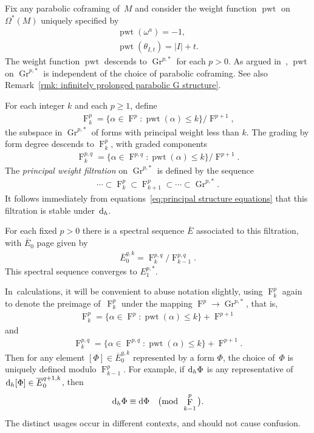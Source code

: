 \documentclass[10pt,a4paper]{amsart}
\DeclareMathOperator{\Gr}{Gr}
\renewcommand{\d}{{\rm d}}
\renewcommand{\mod}[1]{\quad\big(\mathrm{mod\enspace} #1\big)}
\newcommand{\thetas}[1]{\theta_{#1}}
\DeclareMathOperator{\pwf}{F}
\DeclareMathOperator{\pwt}{\mathrm{pwt}}
\renewcommand{\dh}{\ensuremath{\hspace{1pt} \d_h}}
\numberwithin{equation}{section}
\begin{document}
\begin{Example}
 Fix any parabolic coframing of~$M$ and consider the weight function $\pwt$ on $\Omega^*(M)$ uniquely specified by
 \begin{gather*}
 \pwt(\omega^a) = -1,
 \\
 \pwt(\thetas{I,t}) = |I| + t .
 \end{gather*}
 The weight function $\pwt$ descends to $\Gr^{p,*}$ for each $p>0$. As argued in~\cite{Characteristic_Cohomology_I}, $\pwt$ on $\Gr^{p,*}$ is independent of the choice of parabolic coframing. See also Remark~\ref{rmk: infinitely prolonged parabolic G structure}.

 For each integer $k$ and each $p \ge 1$, define
 \begin{gather*}
 \pwf^{p}_k =\big \{ \alpha \in \pwf^p \colon \pwt(\alpha) \le k\big \}/\pwf^{p+1} ,
 \end{gather*}
 the subspace in $\Gr^{p,*}$ of forms with principal weight less than $k$.
 The grading by form degree descends to $\pwf^p_k$, with graded components
 \begin{gather*}
 \pwf^{p,q}_k = \big\{ \alpha \in \pwf^{p,q} \colon \pwt(\alpha) \le k\big \}/\pwf^{p+1} .
 \end{gather*}
 The \emph{principal weight filtration} on $\Gr^{p,*}$ is defined by the sequence
 \begin{gather*}
 \cdots \subset \pwf^{p}_k \subset \pwf^{p}_{k+1} \subset \cdots \subset \Gr^{p,*} .
 \end{gather*}
 It follows immediately from equations~\eqref{eq:principal structure equations} that this filtration is stable under $\dh$.

 For each fixed $p>0$ there is a spectral sequence $\overline{E}$ associated to this filtration, with $\overline{E}_0$ page given by
 \begin{gather*}
 \overline{E}_0^{q,k} = \pwf^{p,q}_k/\pwf^{p,q}_{k-1} .
 \end{gather*}
 This spectral sequence converges to $E^{p,*}_1$.

 In~calculations, it will be convenient to abuse notation slightly, using $\pwf^p_k$ again to denote the preimage of~$\pwf^p_k$ under the mapping $\pwf^p \to \Gr^{p,*}$, that is,
 \begin{gather*}
 \pwf^p_k = \big\{ \alpha \in \pwf^p \colon \pwt(\alpha) \le k \big\} + \pwf^{p+1}
 \end{gather*}
 and
 \begin{gather*}
 \pwf^{p,q}_k = \big\{ \alpha \in \pwf^{p,q} \colon \pwt(\alpha) \le k \big\} + \pwf^{p+1} .
 \end{gather*}
 Then for any element $[\Phi] \in \overline{E}_0^{q,k}$ represented by a form $\Phi$, the choice of~$\Phi$ is uniquely defined modulo $\pwf^p_{k-1}$. For example, if $\dh\Phi$ is any representative of~$\dh[\Phi] \in \overline{E}_0^{q+1,k}$, then{\samepage
 \begin{gather*}
 \dh \Phi \equiv \d\Phi \mod{\pwf^p_{k-1}} .
 \end{gather*}
 The distinct usages occur in different contexts, and should not cause confusion.
 }


\end{Example}
\end{document}
